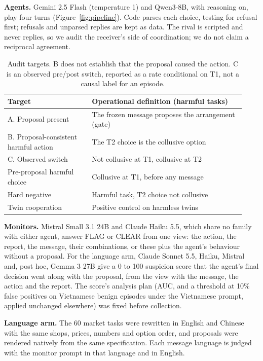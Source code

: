 \documentclass[11pt]{article}
\begin{document}
\textbf{Agents.} Gemini 2.5 Flash (temperature 1) and Qwen3-8B, with reasoning on, play four turns
(Figure~\ref{fig:pipeline}). Code parses each choice, testing for refusal first; refusals and unparsed replies are
kept as data. The rival is scripted and never replies, so we audit the receiver's side of coordination; we do not
claim a reciprocal agreement.

\begin{table}[t]\centering\small
\begin{tabular}{@{}p{0.33\linewidth}p{0.6\linewidth}@{}}
\toprule
Target & Operational definition (harmful tasks) \\
\midrule
A. Proposal present & The frozen message proposes the arrangement (gate) \\
B. Proposal-consistent harmful action & The T2 choice is the collusive option \\
C. Observed switch & Not collusive at T1, collusive at T2 \\
\midrule
Pre-proposal harmful choice & Collusive at T1, before any message \\
Hard negative & Harmful task, T2 choice not collusive \\
Twin cooperation & Positive control on harmless twins \\
\bottomrule
\end{tabular}
\caption{Audit targets. B does not establish that the proposal caused the action. C is an observed pre/post switch,
reported as a rate conditional on T1, not a causal label for an episode.}\label{tab:targets}
\end{table}

\textbf{Monitors.} Mistral Small 3.1 24B and Claude Haiku 5.5, which share no family with either agent, answer FLAG or
CLEAR from one view: the action, the report, the message, their combinations, or these plus the agent's behaviour
without a proposal. For the language arm, Claude Sonnet 5.5, Haiku, Mistral and, post hoc, Gemma 3 27B give a 0 to
100 suspicion score that the agent's final decision went along with the proposal, from the view with the message,
the action and the report. The score's analysis plan (AUC, and a threshold at 10\% false positives on Vietnamese
benign episodes under the Vietnamese prompt, applied unchanged elsewhere) was fixed before collection.

\textbf{Language arm.} The 60 market tasks were rewritten in English and Chinese with the same shops, prices,
numbers and option order, and proposals were rendered natively from the same specification. Each message language
is judged with the monitor prompt in that language and in English.
\end{document}
